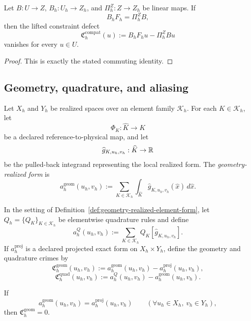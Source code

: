 \begin{proposition}
\label{prop:commuting-constraint-crime-vanishes}
Let \(B:U\to Z\), \(B_h:U_h\to Z_h\), and \(\Pi_h^Z:Z\to Z_h\) be linear maps.
If
\[
B_hF_h=\Pi_h^Z B,
\]
then the lifted constraint defect
\[
\mathfrak C_h^{\mathrm{compat}}(u):=B_hF_hu-\Pi_h^ZBu
\]
vanishes for every \(u\in U\).
\end{proposition}

\begin{proof}
This is exactly the stated commuting identity.
\end{proof}

\subsection{Geometry, quadrature, and aliasing}

\begin{definition}
\label{def:geometry-realized-element-form}
Let \(X_h\) and \(Y_h\) be realized spaces over an element family
\(\mathcal K_h\). For each \(K\in\mathcal K_h\), let
\[
\Phi_K:\widehat K\to K
\]
be a declared reference-to-physical map, and let
\[
\widehat g_{K,u_h,v_h}:\widehat K\to \mathbb{R}
\]
be the pulled-back integrand representing the local realized form. The
\emph{geometry-realized form} is
\[
a_h^{\mathrm{geom}}(u_h,v_h)
:=
\sum_{K\in\mathcal K_h}
\int_{\widehat K}\widehat g_{K,u_h,v_h}(\widehat x)\,d\widehat x.
\]
\end{definition}

\begin{definition}
\label{def:quadrature-realized-form}
In the setting of Definition~\ref{def:geometry-realized-element-form}, let
\(Q_h=\{Q_K\}_{K\in\mathcal K_h}\) be elementwise quadrature rules and define
\[
a_h^Q(u_h,v_h)
:=
\sum_{K\in\mathcal K_h}Q_K[\widehat g_{K,u_h,v_h}].
\]
If \(a_h^{\mathrm{proj}}\) is a declared projected exact form on
\(X_h\times Y_h\), define the geometry and quadrature crimes by
\[
\mathfrak C_h^{\mathrm{geom}}(u_h,v_h)
:=
a_h^{\mathrm{geom}}(u_h,v_h)-a_h^{\mathrm{proj}}(u_h,v_h),
\]
\[
\mathfrak C_h^{\mathrm{quad}}(u_h,v_h)
:=
a_h^Q(u_h,v_h)-a_h^{\mathrm{geom}}(u_h,v_h).
\]
\end{definition}

\begin{theorem}
\label{thm:geometry-exactness-kills-geometry-crime}
If
\[
a_h^{\mathrm{geom}}(u_h,v_h)=a_h^{\mathrm{proj}}(u_h,v_h)
\qquad
(\forall u_h\in X_h,\ v_h\in Y_h),
\]
then \(\mathfrak C_h^{\mathrm{geom}}=0\).
\end{theorem}


